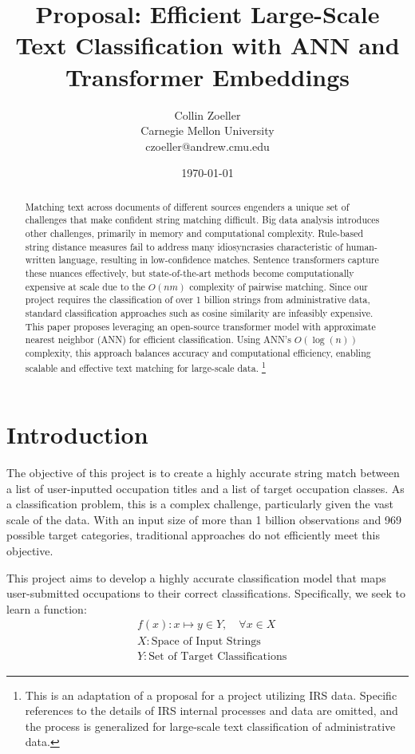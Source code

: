 \documentclass[12pt]{article}
\title{\textbf{Proposal: Efficient Large-Scale Text Classification with ANN and Transformer Embeddings}}
\author{Collin Zoeller \\ Carnegie Mellon University \\ czoeller@andrew.cmu.edu}
\date{\today}
\begin{document}
\maketitle

\begin{abstract}
Matching text across documents of different sources engenders a unique set of challenges that make confident string matching difficult. Big data analysis introduces other challenges, primarily in memory and computational complexity. Rule-based string distance measures fail to address many idiosyncrasies characteristic of human-written language, resulting in low-confidence matches. Sentence transformers capture these nuances effectively, but state-of-the-art methods become computationally expensive at scale due to the $O(nm)$ complexity of pairwise matching. Since our project requires the classification of over 1 billion strings from administrative data, standard classification approaches such as cosine similarity are infeasibly expensive. 
This paper proposes leveraging an open-source transformer model with approximate nearest neighbor (ANN) for efficient classification. Using ANN’s $O(\log(n))$ complexity, this approach balances accuracy and computational efficiency, enabling scalable and effective text matching for large-scale data.
\footnote{This is an adaptation of a proposal for a project utilizing IRS data. Specific references to the details of IRS internal processes and data are omitted, and the process is generalized for large-scale text classification of administrative data.}  
\end{abstract}
\clearpage
\section{Introduction}\label{sec:intro}

The objective of this project is to create a highly accurate string match between a list of user-inputted occupation titles and a list of target occupation classes.  As a classification problem, this is a complex challenge, particularly given the vast scale of the data. With an input size of more than 1 billion observations and 969 possible target categories, traditional approaches do not efficiently meet this objective. 

This project aims to develop a highly accurate classification model that maps user-submitted occupations to their correct classifications. Specifically, we seek to learn a function:
\begin{align*}
   &f(x): x \mapsto y \in Y, \quad \forall x \in X\\
    &X:  \text{Space of Input Strings}\\
    &Y: \text{Set of Target Classifications}
\end{align*}
\end{document}
